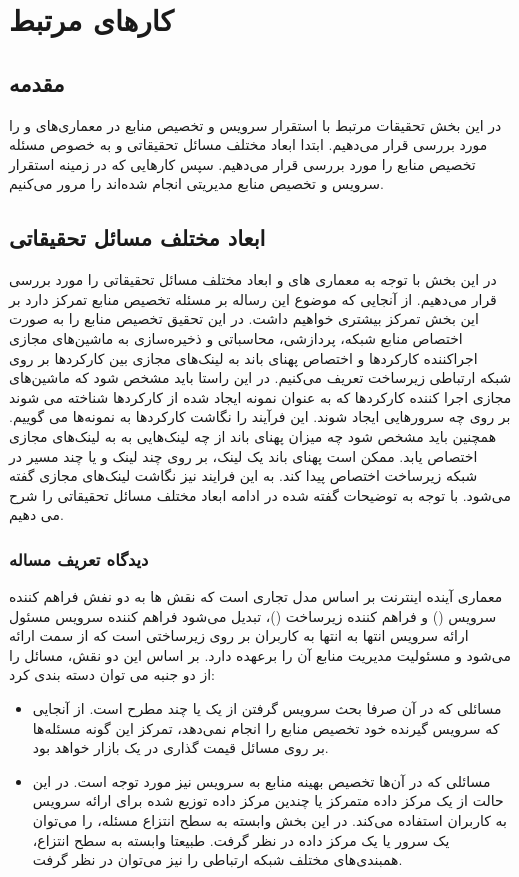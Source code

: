 
\chapter{کارهای مرتبط}

\section{مقدمه}
در این بخش تحقیقات مرتبط با استقرار سرویس و تخصیص منابع در معماری‌های   و  را مورد بررسی قرار می‌دهیم.
ابتدا ابعاد مختلف مسائل تحقیقاتی و به خصوص مسئله تخصیص منابع را مورد بررسی قرار می‌دهیم.
سپس کارهایی که در زمینه استقرار سرویس و تخصیص منابع مدیریتی انجام شده‌اند را مرور می‌کنیم.

\section{ابعاد مختلف مسائل تحقیقاتی}
در این بخش با توجه به معماری های  و  ابعاد مختلف مسائل تحقیقاتی را مورد بررسی قرار می‌دهیم.
از آنجایی که موضوع این رساله بر مسئله تخصیص منابع تمرکز دارد بر این بخش تمرکز بیشتری خواهیم داشت.
در این تحقیق تخصیص منابع را به صورت اختصاص منابع شبکه، پردازشی، محاسباتی و ذخیره‌سازی
به ماشین‌‌های مجازی اجراکننده کارکردها و اختصاص پهنای باند به لینک‌های مجازی بین کارکردها بر روی شبکه ارتباطی زیرساخت تعریف می‌کنیم.
در این راستا باید مشخص شود که ماشین‌های مجازی اجرا کننده کارکردها که به عنوان نمونه ایجاد شده از کارکردها شناخته می شوند
بر روی چه سرورهایی ایجاد شوند.
این فرآیند را نگاشت کارکردها به نمونه‌ها می گوییم.
همچنین باید مشخص شود چه میزان پهنای باند از چه لینک‌هایی به به لینک‌های مجازی اختصاص یابد.
ممکن است پهنای باند یک لینک، بر روی چند لینک و یا چند مسیر در شبکه زیرساخت اختصاص پیدا کند.
به این فرایند نیز نگاشت لینک‌های مجازی گفته می‌شود.
با توجه به توضیحات گفته شده در ادامه ابعاد مختلف مسائل تحقیقاتی را شرح می دهیم.

\subsection{دیدگاه تعریف مساله}
معماری آینده اینترنت بر اساس مدل تجاری  است که
نقش ‌ها به دو نفش فراهم کننده سرویس () و فراهم کننده زیرساخت ()، تبدیل می‌شود
فراهم کننده سرویس مسئول ارائه سرویس انتها به انتها به کاربران بر روی زیرساختی است که
از سمت  ارائه می‌شود و مسئولیت مدیریت منابع آن را برعهده دارد.
بر اساس این دو نقش، مسائل را از دو جنبه می توان دسته بندی کرد:

\begin{itemize}
    \item مسائلی که در آن صرفا بحث سرویس گرفتن از یک یا چند  مطرح است. از آنجایی که سرویس گیرنده خود تخصیص منابع را انجام نمی‌دهد، تمرکز این گونه مسئله‌ها بر روی مسائل قیمت گذاری در یک بازار  خواهد بود.
    \item مسائلی که در آن‌ها تخصیص بهینه منابع به سرویس نیز مورد توجه است. در این حالت  از یک مرکز داده متمرکز یا چندین مرکز داده توزیع شده برای ارائه سرویس به کاربران استفاده می‌کند. در این بخش وابسته به سطح  انتزاع مسئله،  را می‌توان یک سرور یا یک مرکز داده در نظر گرفت. طبیعتا وابسته به سطح انتزاع، همبندی‌‌های مختلف شبکه ارتباطی را نیز می‌توان در نظر گرفت.
\end{itemize}

